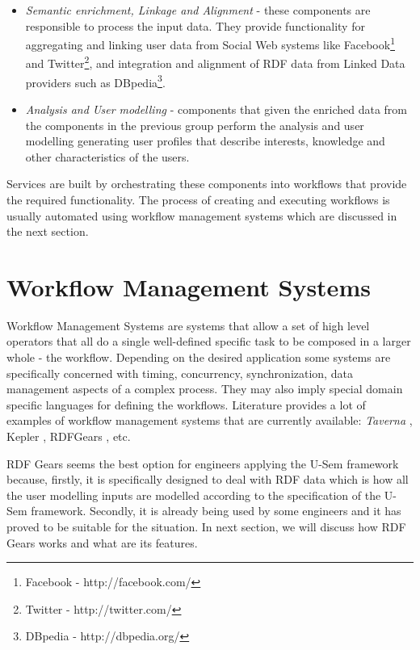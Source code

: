 \begin{itemize}
	\item \textit{Semantic enrichment, Linkage and Alignment} - these components are responsible to process the input data. They provide functionality for aggregating and linking user data from Social Web systems like Facebook\footnote{Facebook - http://facebook.com/} and Twitter\footnote{Twitter - http://twitter.com/}, and integration and alignment of RDF data from Linked Data providers such as DBpedia\footnote{DBpedia - http://dbpedia.org/}.
	
	\item \textit{Analysis and User modelling} - components that given the enriched data from the components in the previous group perform the analysis and user modelling generating user profiles that describe interests, knowledge and other characteristics of the users.
\end{itemize}

Services are built by orchestrating these components into workflows that provide the required functionality. The process of creating and executing workflows is usually automated using workflow management systems which are discussed in the next section.

\section{Workflow Management Systems}
\label{sec:workfloManagement}

Workflow Management Systems are systems that allow a set of high level operators that all do a single well-defined specific task to be composed in a larger whole - the workflow. Depending on the desired application some systems are specifically concerned with  timing, concurrency, synchronization, data management aspects of a complex process. They may also imply special domain specific languages for defining the workflows. Literature provides a lot of examples of workflow management systems that are currently available: \textit{Taverna} \cite{hull2006taverna}, Kepler \cite{ludascher2006scientific}, RDFGears \cite{feliksik2011}, etc.

RDF Gears seems the best option for engineers applying the U-Sem framework because, firstly, it is specifically designed to deal with RDF data which is how all the user modelling inputs are modelled according to the specification of the U-Sem framework. Secondly, it is already being used by some engineers and it has proved to be suitable for the situation. In next section, we will discuss how RDF Gears works and what are its features.

